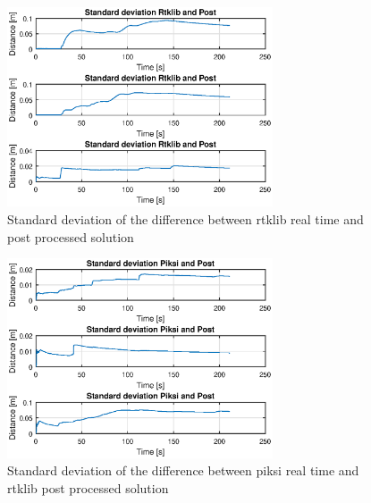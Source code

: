 \begin{figure}[H]
	\centering
		\includegraphics[width=0.7\textwidth]{figs/plots/stdrtkpost.eps}
		\caption{Standard deviation of the difference between rtklib real time and post processed solution}
		\label{figure:RTKLIB_STRUCTURE}
\end{figure}
\begin{figure}[H]
	\centering
		\includegraphics[width=0.7\textwidth]{figs/plots/stdpiksipost.eps}
		\caption{Standard deviation of the difference between piksi real time and rtklib post processed solution}
		\label{figure:RTKLIB_STRUCTURE}
\end{figure}

